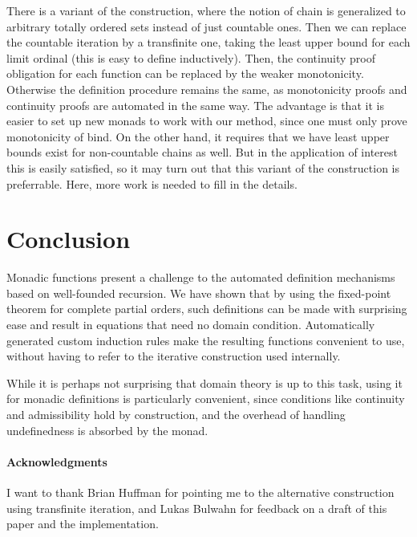 \documentclass[copyright,creativecommons,sharealike]{eptcs}
\theoremstyle{remark}
\begin{document}
\begin{isabellebody}
\begin{isamarkuptext}
There is a variant of the construction, where the notion of chain is
generalized to arbitrary totally ordered sets instead of just
countable ones. Then we can replace the countable iteration by a
transfinite one, taking the least upper bound for each limit ordinal
(this is easy to define inductively). Then, the continuity proof
obligation for each function can be replaced by the weaker
monotonicity. Otherwise the definition procedure remains the same, as
monotonicity proofs and continuity proofs are automated in the same
way. The advantage is that it is easier to set up new monads to work
with our method, since one must only prove monotonicity of bind. On
the other hand, it requires that we have least upper bounds exist for
non-countable chains as well. But in the application of interest this
is easily satisfied, so it may turn out that this variant of the
construction is preferrable. Here, more work is needed to fill in the
details.\end{isamarkuptext}\isamarkuptrue \isadelimtheory
\endisadelimtheory
\isatagtheory
{}\isamarkupfalse \endisatagtheory
{\isafoldtheory}\isadelimtheory
\endisadelimtheory
\end{isabellebody} 

\section{Conclusion}

Monadic functions present a challenge to the automated definition
mechanisms based on well-founded recursion.
We have shown that by using the fixed-point theorem for complete
partial orders, such definitions can be made with surprising ease and
result in equations that need no domain condition.
Automatically generated custom induction rules make the resulting
functions convenient to use, without having to refer to the iterative
construction used internally.

While it is perhaps not surprising that domain theory is up to this
task, using it for monadic definitions is particularly convenient,
since conditions like continuity and admissibility hold by
construction, and the overhead of handling undefinedness is
absorbed by the monad.

\paragraph{Acknowledgments}
I want to thank Brian Huffman for pointing me to the alternative
construction using transfinite iteration, and Lukas Bulwahn for
feedback on a draft of this paper and the implementation.




\end{document}
